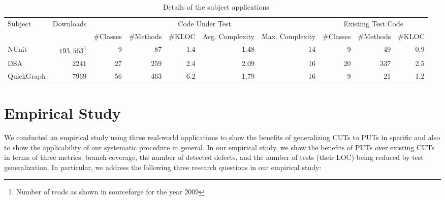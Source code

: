 \begin{table*}[t]%
\centering
\begin{minipage}{\textwidth}
\centering
\begin{tabular}{|l|r|r|r|r|r|r|r|r|r|}
\hline
Subject 		& Downloads 	& \multicolumn{5}{|c|}{Code Under Test} 															&	\multicolumn{3}{|c|}{Existing Test Code} 	\\ \cline{3-10}
						& 						&	\#Classes	&	\#Methods	& \#KLOC	& Avg. Complexity & Max. Complexity	&	\#Classes	&	\#Methods &	\#KLOC						\\ \hline\hline
NUnit				&		$193,563$\footnote{Number of reads as shown in sourceforge for the year 2009}
													&	9					&	87  			&		1.4		&				1.48 			& 14 							&			9			&			49		&		0.9							\\ \hline
DSA					&		$2241$		&	27  			&	259 			&		2.4		&				2.09 			& 16							&			20		&			337		&		2.5							\\ \hline		
QuickGraph	&		$7969$ 		&	56				&	463				&		6.2		&				1.79			& 16							&			9			&			21		&		1.2							\\ \hline
\end{tabular}
\end{minipage} \vspace*{-3ex}
\caption{Details of the subject applications} \vspace*{-3ex}
\label{tab:subjectmetrics}
\end{table*} 

\section{Empirical Study}
\label{sec:study}

We conducted an empirical study using three real-world applications to show the benefits of generalizing CUTs to PUTs in specific and also to show the applicability of our systematic procedure in general. In our empirical study, we show the benefits of PUTs over existing CUTs in terms of three metrics: branch coverage, the number of detected defects, and the number of tests (their LOC) being reduced by test generalization. In particular, we address the following three research questions in our empirical study:

